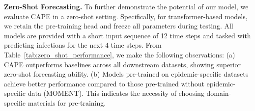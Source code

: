 \begin{table}[t!]
    \centering
    \caption{Zero-shot performance with a lookback window length of 12. All results are averaged over 4 weeks or days in the future. $\Delta (\%)$ stands for the relative improvement of CAPE over the baselines.}
    \label{tab:zero_shot_performance}
\end{table}
\textbf{Zero-Shot Forecasting.} To further demonstrate the potential of our model, we evaluate CAPE in a zero-shot setting. Specifically, for transformer-based models, we retain the pre-training head and freeze all parameters during testing. All models are provided with a short input sequence of 12 time steps and tasked with predicting infections for the next 4 time steps. From Table~\ref{tab:zero_shot_performance}, we make the following observations: (a) CAPE outperforms baselines across all downstream datasets, showing superior zero-shot forecasting ability. (b) Models pre-trained on epidemic-specific datasets achieve better performance compared to those pre-trained without epidemic-specific data (MOMENT). This indicates the necessity of choosing domain-specific materials for pre-training.




